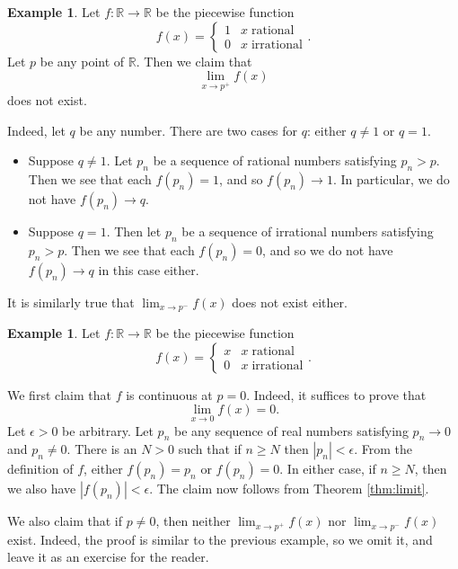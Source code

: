 \documentclass[12pt]{article}
\theoremstyle{definition}
\newtheorem{example}[definition]{Example}
\theoremstyle{theorem}
\begin{document}
\begin{example}
Let $f : \mathbb{R} \to \mathbb{R}$ be the piecewise function 
\[
f(x) = \begin{cases}
1 & x \; \text{rational} \\
0 & x \; \text{irrational}
\end{cases}.
\]
Let $p$ be any point of $\mathbb{R}$. Then we claim that 
\[
\lim_{x \to p^+}f(x)
\]
does not exist. 

Indeed, let $q$ be any number. There are two cases for $q$: either $q \ne 1$ or $q = 1$. 
\begin{itemize}
\item Suppose $q \neq 1$. Let $p_n$ be a sequence of rational numbers satisfying $p_n > p$. Then we see that each $f(p_n) = 1$, and so $f(p_n) \to 1$. In particular, we do not have $f(p_n) \to q$. 
\item Suppose $q = 1$. Then let $p_n$ be a sequence of irrational numbers satisfying $p_n > p$. Then we see that each $f(p_n) = 0$, and so we do not have $f(p_n) \to q$ in this case either.  
\end{itemize}
It is similarly true that $\lim_{x \to p^-}f(x)$ does not exist either. 
\end{example}

\begin{example}
Let $f : \mathbb{R} \to \mathbb{R}$ be the piecewise function 
\[
f(x) = \begin{cases}
x & x \; \text{rational} \\
0 & x \; \text{irrational}
\end{cases}.
\]

We first claim that $f$ is continuous at $p = 0$. Indeed, it suffices to prove that 
\[
\lim_{x \to 0}f(x) = 0.
\]
Let $\epsilon > 0$ be arbitrary. Let $p_n$ be any sequence of real numbers satisfying $p_n \to 0$ and $p_n \ne 0$. There is an $N > 0$ such that if $n \geqslant N$ then $|p_n| < \epsilon$. From the definition of $f$, either $f(p_n) = p_n$ or $f(p_n) = 0$. In either case, if $n \geqslant N$, then we also have $|f(p_n)| < \epsilon$. The claim now follows from Theorem \ref{thm:limit}. 

We also claim that if $p \ne 0$, then neither $\lim_{x \to p^+}f(x)$ nor $\lim_{x \to p^-}f(x)$ exist. Indeed, the proof is similar to the previous example, so we omit it, and leave it as an exercise for the reader.  
\end{example}
\end{document}
